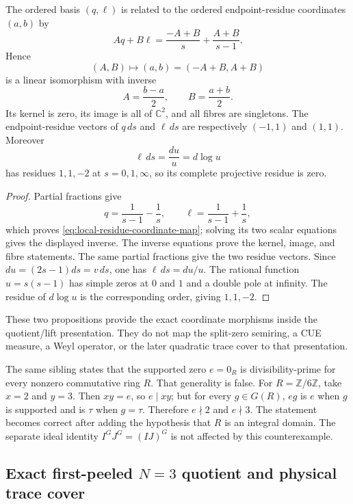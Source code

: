 \begin{proposition}
\label{prop:local-residue-coordinate-map}
The ordered basis $(q,\ell)$ is related to the ordered endpoint-residue coordinates $(a,b)$ by
\begin{equation}
 Aq+B\ell=\frac{-A+B}{s}+\frac{A+B}{s-1}.
 \label{eq:local-residue-coordinate-map}
\end{equation}
Hence
\[
 (A,B)\longmapsto(a,b)=(-A+B,A+B)
\]
is a linear isomorphism with inverse
\[
 A=\frac{b-a}{2},\qquad B=\frac{a+b}{2}.
\]
Its kernel is zero, its image is all of $\mathbb C^2$, and all fibres are singletons.  The
endpoint-residue vectors of $q\,ds$ and $\ell\,ds$ are respectively $(-1,1)$ and $(1,1)$.
Moreover
\[
 \ell\,ds=\frac{du}{u}=d\log u
\]
has residues $1,1,-2$ at $s=0,1,\infty$, so its complete projective residue is zero.
\end{proposition}
\begin{proof}
Partial fractions give
\[
 q=\frac1{s-1}-\frac1s,
 \qquad
 \ell=\frac1{s-1}+\frac1s,
\]
which proves \eqref{eq:local-residue-coordinate-map}; solving its two scalar equations gives
the displayed inverse.  The inverse equations prove the kernel, image, and fibre statements.
The same partial fractions give the two residue vectors.  Since
$du=(2s-1)ds=v\,ds$, one has $\ell\,ds=du/u$.  The rational function
$u=s(s-1)$ has simple zeros at $0$ and $1$ and a double pole at infinity.  The residue of
$d\log u$ is the corresponding order, giving $1,1,-2$.
\end{proof}

These two propositions provide the exact coordinate morphisms inside the quotient/lift
presentation.  They do not map the split-zero semiring, a CUE measure, a Weyl operator, or the
later quadratic trace cover to that presentation.

The same sibling states that the supported zero $e=0_R$ is divisibility-prime for every
nonzero commutative ring $R$.  That generality is false.  For
$R=\mathbb Z/6\mathbb Z$, take $x=2$ and $y=3$.  Then $xy=e$, so $e\mid xy$; but for every
$g\in G(R)$, $eg$ is $e$ when $g$ is supported and is $\tau$ when $g=\tau$.  Therefore
$e\nmid2$ and $e\nmid3$.  The statement becomes correct after adding the hypothesis that
$R$ is an integral domain.  The separate ideal identity
$I^GJ^G=(IJ)^G$ is not affected by this counterexample.

\subsection{Exact first-peeled \texorpdfstring{$N=3$}{N=3} quotient and physical trace cover}

